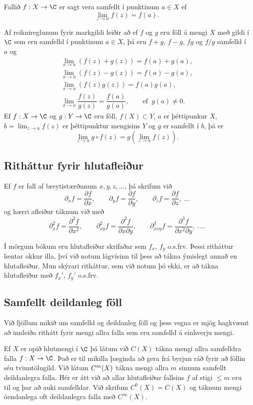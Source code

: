 Fallið $f:X\to \C$ er sagt vera samfellt í punktinum $a\in X$ ef
$$
\lim_{z\to a}f(z)=f(a).
$$


Af reiknireglunum fyrir markgildi leiðir að ef $f$ og $g$ eru föll
á mengi $X$ með gildi í $\C$ sem eru samfelld í punktinum $a\in X$, þá
eru $f+g$, $f-g$, $fg$ og $f/g$ samfelld í $a$ og 
\begin{gather*}
\lim_{x\to a}(f(z)+g(z))=f(a)+g(a),\\
\lim_{x\to a}(f(z)-g(z))=f(a)-g(a),\\
\lim_{x\to a}(f(z)g(z))=f(a)g(a),\\
\lim_{x\to a}\dfrac{f(z)}{g(z)}=\dfrac{f(a)}{g(a)}, 
\qquad \text{ef } \ g(a)\neq 0.
\end{gather*}
Ef $f:X\to \C$ og $g:Y\to \C$ eru föll,  $f(X)\subset Y$,
$a$ er þéttipunkur $X$, $b=\lim_{z\to a}f(z)$ er
þéttipunktur mengisins $Y$ og $g$ er samfellt í $b$, þá er
$$
\lim_{z\to a} g\circ f(z)=g(\lim_{z\to a}f(z)).
$$



\subsection*{Ritháttur fyrir hlutafleiður}


Ef $f$ er fall af breytistærðunum $x,y,z,\dots$, þá skrifum við
$$
{\partial}_xf=\dfrac{\partial f}{\partial x}, \qquad
{\partial}_yf=\dfrac{\partial f}{\partial y}, \qquad
{\partial}_zf=\dfrac{\partial f}{\partial z}, \ \dots
$$
og hærri afleiður táknum við með
$$
{\partial}_x^2f=\dfrac{\partial^2f}{\partial x^2}, \qquad
{\partial}_{xy}^2f=\dfrac{\partial^2f}{\partial x\partial y}, \qquad
{\partial}_{xxy}^3f=\dfrac{\partial^3f}{\partial x^2\partial y}, \ \dots.
$$

Í mörgum bókum eru hlutafleiður skrifaðar sem $f_{x}$, $f_y$ o.s.frv.
 Þessi
ritháttur hentar okkur illa, því við notum lágvísinn til þess að tákna
ýmislegt annað en hlutafleiður.  Mun skýrari ritháttur, sem við notum
þó ekki,  er að tákna
hlutafleiður með $f_x'$, $f_y'$ o.s.frv.  

\subsection*{Samfellt deildanleg föll}

\medskip\noindent
Við fjöllum mikið  um
samfelld og deildanleg föll  og 
þess vegna er mjög hagkvæmt að innleiða rithátt fyrir mengi allra falla
sem eru samfelld á einhverju mengi.


Ef $X$ er opið hlutmengi í $\C$ þá látum við $C(X)$ tákna mengi
allra samfelldra falla $f:X\to \C$.  Það er til mikilla þæginda að
gera frá byrjun ráð fyrir að föllin séu tvinntölugild.  Við látum
$C\sp m(X)$ tákna mengi allra $m$ sinnum samfellt
deildanlegra falla.
Hér er átt við að allar hlutafleiður fallsins $f$ af stigi $\leq m$
eru til og þar að auki samfelldar.  Við skrifum $C^0(X)=C(X)$ og
táknum mengi óendanlega oft deildanlegra falla með $C^{\infty}(X)$.


